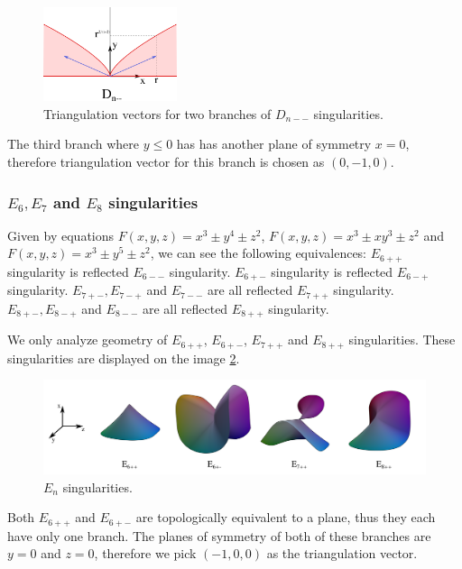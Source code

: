 \begin{figure}
    \centerline{\includegraphics[width=0.35\textwidth]{images/img9}}
    \caption[Triangulation vectors for two branches of $D_{n--}$ singularities.]
    {Triangulation vectors for two branches of $D_{n--}$ singularities.}
    \label{img:9}
\end{figure}

The third branch where $y\leq0$ has has another plane of symmetry $x=0$,
therefore triangulation vector for this branch is chosen as $(0, -1, 0)$.

\subsubsection*{$E_6, E_7$ and $E_8$ singularities}

Given by equations $F(x,y,z)=x^3\pm y^4\pm z^2$, $F(x,y,z)=x^3\pm xy^3\pm z^2$
and $F(x,y,z)=x^3\pm y^5\pm z^2$, we can see the following equivalences:
$E_{6++}$ singularity is reflected $E_{6--}$ singularity.
$E_{6+-}$ singularity is reflected $E_{6-+}$ singularity.
$E_{7+-}, E_{7-+}$ and $E_{7--}$ are all reflected $E_{7++}$ singularity.
$E_{8+-}, E_{8-+}$ and $E_{8--}$ are all reflected $E_{8++}$ singularity.

We only analyze geometry of $E_{6++}$, $E_{6+-}$, $E_{7++}$ and $E_{8++}$
singularities. These singularities are displayed on the image \ref{img:12}.


\begin{figure}
    \centerline{\includegraphics[width=1\textwidth]{images/img12}}
    \caption[$E_n$ singularities.]
    {$E_n$ singularities. \cite{singsurf}}
    \label{img:12}
\end{figure}
Both $E_{6++}$ and $E_{6+-}$ are topologically equivalent to a plane, thus
they each have only one branch. The planes of symmetry of both of these 
branches are $y=0$ and $z=0$, therefore we pick $(-1, 0, 0)$ as the
triangulation vector.

